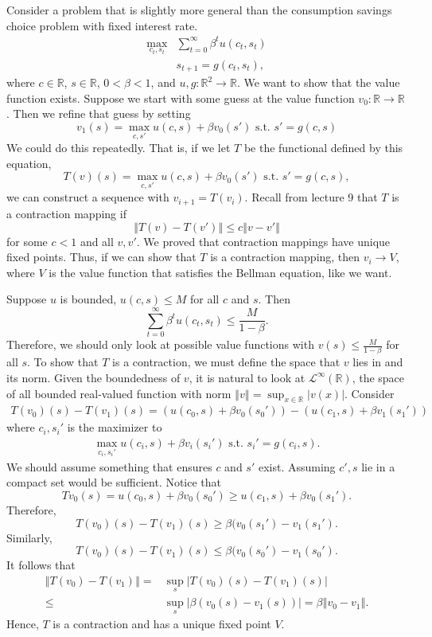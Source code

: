 \documentclass[12pt,reqno]{amsart}
\theoremstyle{definition}
\def\R{\mathbb{R}}
\newcommand{\norm}[1]{\left\Vert {#1} \right\Vert}
\renewcommand{\to}{{\rightarrow}}
\begin{document}
Consider a problem that is slightly more general than the consumption
savings choice problem with fixed interest rate.
\begin{align*}
  \max_{c_t,s_t} & \sum_{t=0}^\infty \beta^t u(c_t,s_t) \\
  & s_{t+1} = g(c_t,s_t),
\end{align*}
where $c \in \R$, $s \in \R$, $0<\beta<1$, and $u,g:\R^2 \to \R$.
We want to show that the value function exists. Suppose we start with
some guess at the value function $v_0:\R\to \R$. Then we refine that guess by
setting 
\[ v_1(s) = \max_{c,s'} u(c,s) + \beta v_0(s') \text{ s.t. }
s'=g(c,s) \]
We could do this repeatedly. That is, if we let $T$ be the functional
defined by this equation,
\[ T(v)(s) = \max_{c,s'} u(c,s) + \beta v_0(s') \text{ s.t. }
s'=g(c,s), \]
we can construct a sequence with $v_{i+1} = T(v_i)$. Recall from
lecture 9 that $T$ is a contraction mapping if 
\[ \norm{T(v) - T(v')} \leq c \norm{v-v'} \] for some $c<1$ and all
$v,v'$. We proved that contraction mappings have unique fixed
points. Thus, if we can show that $T$ is a contraction mapping, then
$v_i \to V$, where $V$ is the value function that satisfies the
Bellman equation, like we want.

Suppose $u$ is bounded, $u(c,s) \leq M$ for all $c$ and $s$. Then 
\[ \sum_{t=0}^\infty \beta^t u(c_t,s_t)  \leq \frac{M}{1-\beta}. \]
Therefore, we should only look at possible value functions with $v(s)
\leq \frac{M}{1-\beta}$ for all $s$. To show that $T$ is a
contraction, we must define the space that $v$ lies in and its
norm. Given the boundedness of $v$, it is natural to look at
$\mathcal{L}^\infty(\R)$, the space of all bounded real-valued function
with norm $\norm{v} = \sup_{x \in \R} |v(x)|$. Consider
\begin{align*}
  T(v_0)(s)-T(v_1)(s) =  \left(u(c_0,s) + \beta v_0(s_0')  \right) -
  \left(u(c_1,s) + \beta v_1(s_1')  \right)
\end{align*} 
where $c_i,s_i'$ is the maximizer to 
\begin{align*}
  \max_{c_i,s_i'} u(c_i,s) + \beta v_i(s_i') \text{ s.t. }
  s_i'=g(c_i,s).
\end{align*}
We should assume something that ensures $c$ and $s'$ exist. Assuming
$c',s$ lie in a compact set would be sufficient. Notice that
\[ T v_0 (s) = u(c_0,s) + \beta v_0(s_0')  \geq u(c_1,s) + \beta
v_0(s_1'). \]
Therefore,
\[ T(v_0)(s) - T(v_1)(s) \geq \beta (v_0(s_1') - v_1(s_1'). \]
Similarly,
\[ T(v_0)(s)-T(v_1)(s) \leq \beta (v_0(s_0') - v_1(s_0'). \]
It follows that
\begin{align*}
  \norm{T(v_0)-T(v_1)} = & \sup_{s} \left\vert T(v_0)(s)-T(v_1)(s) \right\vert \\
  \leq & \sup_s \left\vert \beta(v_0(s) -v_1(s)) \right\vert = \beta
  \norm{v_0 - v_1}.
\end{align*}
Hence, $T$ is a contraction and has a unique fixed point $V$. 
\end{document}
